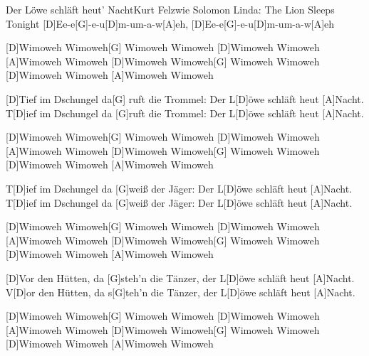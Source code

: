 \documentclass[../main.tex]{subfiles}
\begin{document}
\begin{song}[4]{Der Löwe schläft heut' Nacht}{Kurt Felz}{wie Solomon Linda: The Lion Sleeps Tonight}
[D]Ee-e[G]-e-u[D]m-um-a-w[A]eh, [D]Ee-e[G]-e-u[D]m-um-a-w[A]eh

[D]Wimoweh Wimoweh[G] Wimoweh Wimoweh [D]Wimoweh Wimoweh [A]Wimoweh Wimoweh
[D]Wimoweh Wimoweh[G] Wimoweh Wimoweh [D]Wimoweh Wimoweh [A]Wimoweh Wimoweh

[D]Tief im Dschungel da[G] ruft die Trommel:
Der L[D]{ö}we schläft heut [A]Nacht.
T[D]ief im Dschungel da [G]ruft die Trommel:
Der L[D]{ö}we schläft heut [A]Nacht.

[D]Wimoweh Wimoweh[G] Wimoweh Wimoweh [D]Wimoweh Wimoweh [A]Wimoweh Wimoweh
[D]Wimoweh Wimoweh[G] Wimoweh Wimoweh [D]Wimoweh Wimoweh [A]Wimoweh Wimoweh

T[D]ief im Dschungel da [G]weiß der Jäger:
Der L[D]{ö}we schläft heut [A]Nacht.
T[D]ief im Dschungel da [G]weiß der Jäger:
Der L[D]{ö}we schläft heut [A]Nacht.

[D]Wimoweh Wimoweh[G] Wimoweh Wimoweh [D]Wimoweh Wimoweh [A]Wimoweh Wimoweh
[D]Wimoweh Wimoweh[G] Wimoweh Wimoweh [D]Wimoweh Wimoweh [A]Wimoweh Wimoweh

[D]Vor den Hütten, da [G]steh'n die Tänzer,
der L[D]{ö}we schläft heut [A]Nacht.
V[D]or den Hütten, da s[G]teh'n die Tänzer,
der L[D]{ö}we schläft heut [A]Nacht.

[D]Wimoweh Wimoweh[G] Wimoweh Wimoweh [D]Wimoweh Wimoweh [A]Wimoweh Wimoweh
[D]Wimoweh Wimoweh[G] Wimoweh Wimoweh [D]Wimoweh Wimoweh [A]Wimoweh Wimoweh
\end{song}
\end{document}
